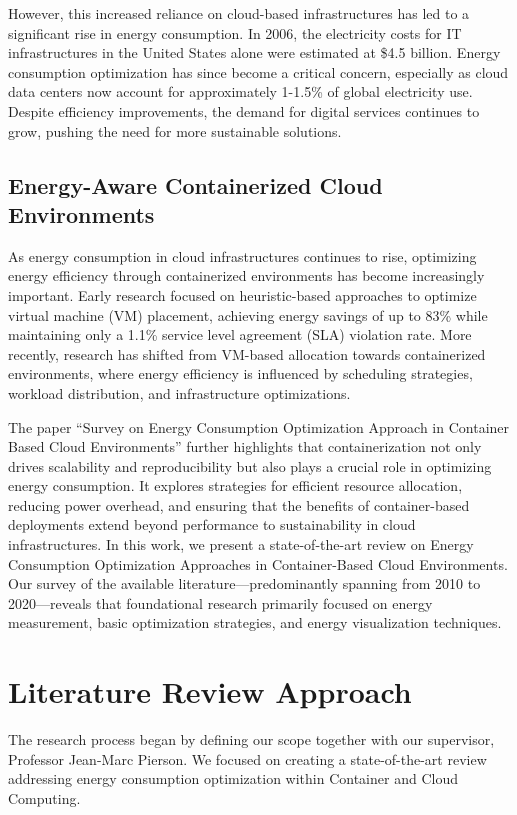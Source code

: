 \documentclass[runningheads]{llncs}
\begin{document}
However, this increased reliance on cloud-based infrastructures has led to a significant rise in energy 
consumption. In 2006, the electricity costs for IT infrastructures in the United States alone were 
estimated at \$4.5 billion\cite{beloglazov_energy_2010}. Energy consumption optimization has since become a 
critical concern, especially as cloud data centers now account for approximately 1-1.5\% of global 
electricity use\cite{IEADataCentres}. Despite efficiency improvements, the demand for digital 
services continues to grow, pushing the need for more sustainable solutions.

\subsection{Energy-Aware Containerized Cloud Environments}
As energy consumption in cloud infrastructures continues to rise, optimizing energy efficiency through 
containerized environments has become increasingly important. Early research focused on heuristic-based 
approaches to optimize virtual machine (VM) placement, achieving 
energy savings of up to 83\% while maintaining only a 1.1\% service level agreement (SLA) violation 
rate\cite{beloglazov_energy_2010}. More recently, research has shifted from VM-based allocation towards 
containerized environments, where energy efficiency is influenced by scheduling strategies, workload 
distribution, and infrastructure optimizations. 

The paper ``Survey on Energy Consumption Optimization Approach in Container Based Cloud Environments'' 
further highlights that containerization not only drives scalability and 
reproducibility but also plays a crucial role in optimizing energy consumption. It 
explores strategies for efficient resource allocation, reducing power overhead, and 
ensuring that the benefits of container-based deployments extend beyond performance 
to sustainability in cloud infrastructures.
In this work, we present a state-of-the-art review on Energy Consumption Optimization Approaches in 
Container-Based Cloud Environments. Our survey of the available literature—predominantly spanning 
from 2010 to 2020—reveals that foundational research primarily focused on energy measurement, 
basic optimization strategies, and energy visualization techniques\cite{beloglazov_energy_2010}.

\section{Literature Review Approach}
The research process began by defining our scope together with our supervisor, Professor Jean-Marc Pierson. We focused on creating a state-of-the-art review 
addressing energy consumption optimization within Container and Cloud Computing.
\end{document}
